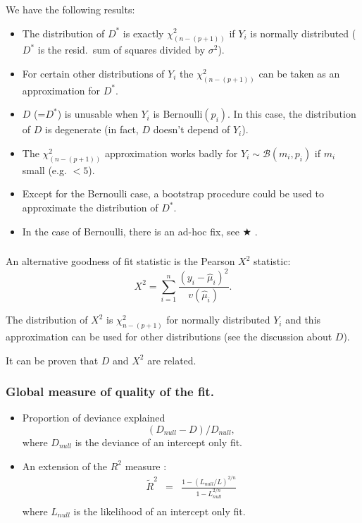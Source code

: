 \documentclass{beamer}
\newcommand{\bs}{\bigskip}
\begin{document}
\begin{frame}
\frametitle{}
We have the following results:
\begin{itemize}
\item The distribution of $D^*$ is exactly
$\chi^2_{(n-(p+1))}$ if $Y_i$ is normally distributed ($D^*$ is the resid.\ 
sum of squares divided by $\sigma^2$). 
\item For certain other distributions of $Y_i$ the $\chi^2_{(n-(p+1))}$ can be taken
as an approximation for $D^*$.
\item $D$ (=$D^*$) is unusable when $Y_i$ is Bernoulli$(p_i)$. In this case, the
distribution of $D$ is degenerate (in fact, $D$ doesn't depend of $Y_i$).
\item The  $\chi^2_{(n-(p+1))}$ approximation works badly for $Y_i \sim {\mathcal
B}(m_i,p_i)$ if $m_i$ small (e.g. $<5$).
\item Except for the Bernoulli case, a bootstrap
  procedure could be
used to approximate the distribution of $D^*$.
\item In the case of Bernoulli, there is an ad-hoc fix, see {\color{red}
$\bigstar$ \citeN{Hosm:Leme:1980}}.
\end{itemize}
\end{frame}


\begin{frame}
\frametitle{}
An alternative goodness of fit statistic is the Pearson $X^2$ statistic:
$$X^2 = \sum_{i=1}^n \frac{(y_i - \hat{\mu}_i)^2}{v(\hat{\mu}_i)}.$$

\bs
The distribution of $X^2$ is $\chi^2_{n-(p+1)}$ for normally distributed $Y_i$ and
this approximation can be used for other distributions (see the discussion about
$D$).

\bs

It can be proven that $D$ and $X^2$ are related.
\end{frame}


\begin{frame}
\frametitle{Global measure of quality of the fit.}

\begin{itemize}
\item {\color{blue}Proportion of deviance explained}
$$(D_{null}-D)/D_{null},$$
where $D_{null}$ is the deviance of an intercept only fit.
\item An {\color{blue}extension of the $R^2$ measure} \cite{Nage:1991}:
\begin{eqnarray*}
\widetilde{R}^2 & = & \frac{1-(L_{null}/L)^{2/n}}{1-L_{null}^{2/n}}\\
\end{eqnarray*}
where $L_{null}$ is the likelihood of an intercept only fit.
\end{itemize}
\end{frame}
\end{document}
